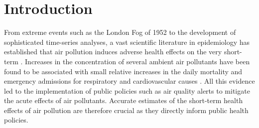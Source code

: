 \documentclass[12pt]{article}
\begin{document}
\begin{titlepage}
\begin{abstract}
\bigskip
\end{abstract}
\setcounter{page}{0}
\thispagestyle{empty}
\end{titlepage}
\pagebreak \newpage

\doublespacing





\section{Introduction}
     
    From extreme events such as the London Fog of 1952 to the development of sophisticated time-series analyses, a vast scientific literature in epidemiology has established that air pollution induces adverse health effects on the very short-term \citep{schwartz1994people, le2002short, bell2004time, di_association_2017, liu_ambient_2019}. Increases in the concentration of several ambient air pollutants have been found to be associated with small relative increases in the daily mortality and emergency admissions for respiratory and cardiovascular causes \citep{samet2000national, shah2015short, orellano2020short}. All this evidence led to the implementation of public policies such as air quality alerts to mitigate the acute effects of air pollutants. Accurate estimates of the short-term health effects of air pollution are therefore crucial as they directly inform public health policies.
    
\end{document}
